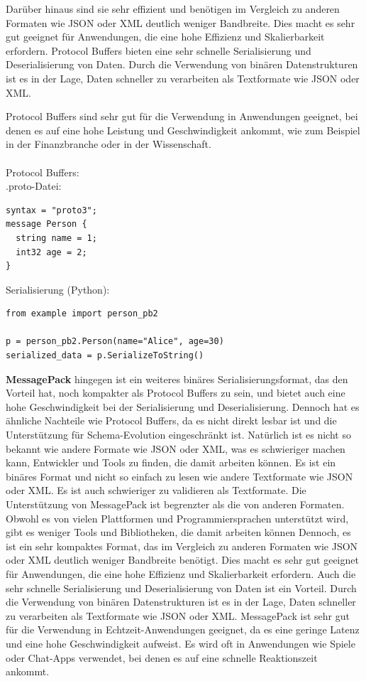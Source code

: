 \documentclass[../vs-script-first-v01.tex]{subfiles}
\begin{document}
Darüber hinaus sind sie sehr effizient und benötigen im Vergleich zu anderen Formaten wie JSON oder XML deutlich weniger Bandbreite. Dies macht es sehr gut geeignet für Anwendungen, die eine hohe Effizienz und Skalierbarkeit erfordern. Protocol Buffers bieten eine sehr schnelle Serialisierung und Deserialisierung von Daten. Durch die Verwendung von binären Datenstrukturen ist es in der Lage, Daten schneller zu verarbeiten als Textformate wie JSON oder XML.

Protocol Buffers sind sehr gut für die Verwendung in Anwendungen geeignet, bei denen es auf eine hohe Leistung und Geschwindigkeit ankommt, wie zum Beispiel in der Finanzbranche oder in der Wissenschaft.\\\\

Protocol Buffers:\\
.proto-Datei:\\
\begin{lstlisting}[caption={Protocol Buffers},captionpos=b,label={lst:buffers}]
syntax = "proto3";
message Person {
  string name = 1;
  int32 age = 2;
}
\end{lstlisting}
Serialisierung (Python):\\
\begin{lstlisting}[caption={Protocol Buffers (Python)},captionpos=b,label={lst:buffers_python}]
from example import person_pb2

p = person_pb2.Person(name="Alice", age=30)
serialized_data = p.SerializeToString()
\end{lstlisting}
\textbf{MessagePack} hingegen ist ein weiteres binäres Serialisierungsformat, das den Vorteil hat, noch kompakter als Protocol Buffers zu sein, und bietet auch eine hohe Geschwindigkeit bei der Serialisierung und Deserialisierung. Dennoch hat es ähnliche Nachteile wie Protocol Buffers, da es nicht direkt lesbar ist und die Unterstützung für Schema-Evolution eingeschränkt ist. Natürlich ist es nicht so bekannt wie andere Formate wie JSON oder XML, was es schwieriger machen kann, Entwickler und Tools zu finden, die damit arbeiten können. Es ist ein binäres Format und nicht so einfach zu lesen wie andere Textformate wie JSON oder XML. Es ist auch schwieriger zu validieren als Textformate.
Die Unterstützung von MessagePack ist begrenzter als die von anderen Formaten. Obwohl es von vielen Plattformen und Programmiersprachen unterstützt wird, gibt es weniger Tools und Bibliotheken, die damit arbeiten können Dennoch, es ist ein sehr kompaktes Format, das im Vergleich zu anderen Formaten wie JSON oder XML deutlich weniger Bandbreite benötigt. Dies macht es sehr gut geeignet für Anwendungen, die eine hohe Effizienz und Skalierbarkeit erfordern.
Auch die sehr schnelle Serialisierung und Deserialisierung von Daten ist ein Vorteil. Durch die Verwendung von binären Datenstrukturen ist es in der Lage, Daten schneller zu verarbeiten als Textformate wie JSON oder XML.
MessagePack ist sehr gut für die Verwendung in Echtzeit-Anwendungen geeignet, da es eine geringe Latenz und eine hohe Geschwindigkeit aufweist. Es wird oft in Anwendungen wie Spiele oder Chat-Apps verwendet, bei denen es auf eine schnelle Reaktionszeit ankommt.\\\\
\end{document}
